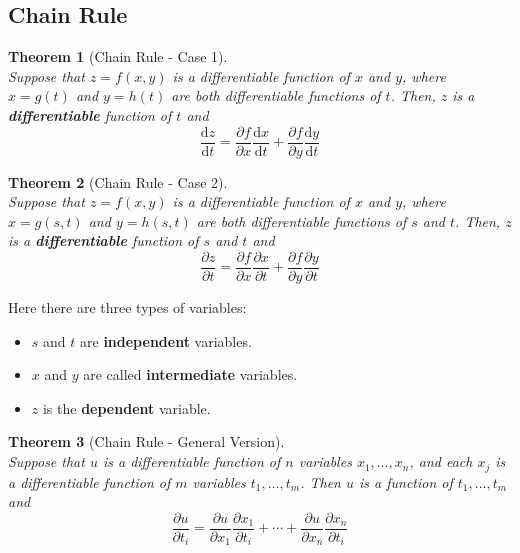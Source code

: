 \documentclass[12pt]{article}
\newtheorem{theorem}{Theorem}[section]
\theoremstyle{definition}
\newcommand{\diff}{\mathrm{d}}
\begin{document}
\subsection{Chain Rule}
\begin{theorem}[Chain Rule - Case 1]
\hfill\\\normalfont Suppose that $z=f(x,y)$ is a \textit{differentiable} function of $x$ and $y$, where $x=g(t)$ and $y=h(t)$ are both \textit{differentiable} functions of $t$. Then, $z$ is a \textbf{differentiable} function of $t$ and
\[
\frac{\diff z}{\diff t}=\frac{\partial f}{\partial x}\frac{\diff x}{\diff t}+\frac{\partial f}{\partial y}\frac{\diff y}{\diff t}
\] 
\end{theorem}
\begin{theorem}[Chain Rule - Case 2]
\hfill\\\normalfont Suppose that $z=f(x,y)$ is a \textit{differentiable} function of $x$ and $y$, where $x=g(s,t)$ and $y=h(s,t)$ are both \textit{differentiable} functions of $s$ and $t$. Then, $z$ is a \textbf{differentiable} function of $s$ and $t$ and
\[
\frac{\partial z}{\partial t}=\frac{\partial f}{\partial x}\frac{\partial x}{\partial t}+\frac{\partial f}{\partial y}\frac{\partial y}{\partial t}
\] 
\end{theorem}
Here there are three types of variables:
\begin{itemize}
  \item $s$ and $t$ are \textbf{independent} variables.
  \item $x$ and $y$ are called \textbf{intermediate} variables.
  \item $z$ is the \textbf{dependent} variable.
\end{itemize}
\begin{theorem}[Chain Rule - General Version]
\hfill\\\normalfont Suppose that $u$ is a differentiable function of $n$ variables $x_1,\ldots, x_n$, and each $x_j$ is a differentiable function of $m$ variables $t_1,\ldots ,t_m$. Then $u$ is a function of $t_1,\ldots, t_m$ and
\[
\frac{\partial u}{\partial t_i}=\frac{\partial u}{\partial x_1}\frac{\partial x_1}{\partial t_i}+\cdots+\frac{\partial u}{\partial x_n}\frac{\partial x_n}{\partial t_i}
\]
\end{theorem}
\end{document}
